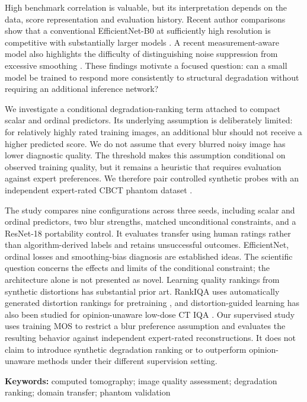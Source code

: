 \documentclass[11pt]{article}
\begin{document}
High benchmark correlation is valuable, but its interpretation depends on the data, score representation and evaluation history. Recent author comparisons show that a conventional EfficientNet-B0 at sufficiently high resolution is competitive with substantially larger models \cite{medsiglipcode}. A recent measurement-aware model also highlights the difficulty of distinguishing noise suppression from excessive smoothing \cite{measurement}. These findings motivate a focused question: can a small model be trained to respond more consistently to structural degradation without requiring an additional inference network?

We investigate a conditional degradation-ranking term attached to compact scalar and ordinal predictors. Its underlying assumption is deliberately limited: for relatively highly rated training images, an additional blur should not receive a higher predicted score. We do not assume that every blurred noisy image has lower diagnostic quality. The threshold makes this assumption conditional on observed training quality, but it remains a heuristic that requires evaluation against expert preferences. We therefore pair controlled synthetic probes with an independent expert-rated CBCT phantom dataset \cite{cbctpaper,cbctdata}.

The study compares nine configurations across three seeds, including scalar and ordinal predictors, two blur strengths, matched unconditional constraints, and a ResNet-18 portability control. It evaluates transfer using human ratings rather than algorithm-derived labels and retains unsuccessful outcomes. EfficientNet, ordinal losses and smoothing-bias diagnosis are established ideas. The scientific question concerns the effects and limits of the conditional constraint; the architecture alone is not presented as novel.
Learning quality rankings from synthetic distortions has substantial prior art. RankIQA uses automatically generated distortion rankings for pretraining \cite{rankiqa}, and distortion-guided learning has also been studied for opinion-unaware low-dose CT IQA \cite{distortionct}. Our supervised study uses training MOS to restrict a blur preference assumption and evaluates the resulting behavior against independent expert-rated reconstructions. It does not claim to introduce synthetic degradation ranking or to outperform opinion-unaware methods under their different supervision setting.

\noindent\textbf{Keywords:} computed tomography; image quality assessment; degradation ranking; domain transfer; phantom validation
\end{document}
